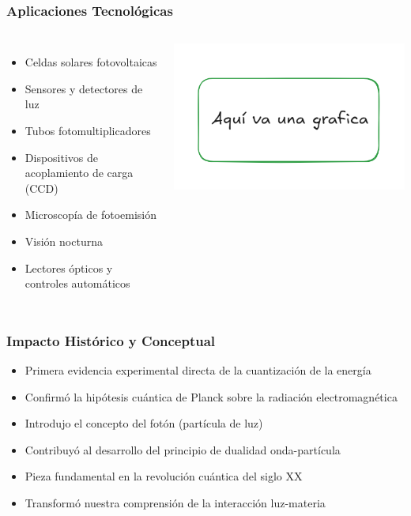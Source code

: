 \documentclass{beamer}
\begin{document}
	\begin{frame}
		\frametitle{Aplicaciones Tecnológicas}
		\begin{columns}
			\begin{itemize}
				\item Celdas solares fotovoltaicas
				\item Sensores y detectores de luz
				\item Tubos fotomultiplicadores
				\item Dispositivos de acoplamiento de carga (CCD)
				\item Microscopía de fotoemisión
				\item Visión nocturna
				\item Lectores ópticos y controles automáticos
			\end{itemize}
			
			\includegraphics[width=\textwidth]{../Imagenes/grafica_pendiente}
		\end{columns}
	\end{frame}
	
	\begin{frame}
		\frametitle{Impacto Histórico y Conceptual}
		\begin{itemize}
			\item Primera evidencia experimental directa de la cuantización de la energía
			\item Confirmó la hipótesis cuántica de Planck sobre la radiación electromagnética
			\item Introdujo el concepto del fotón (partícula de luz)
			\item Contribuyó al desarrollo del principio de dualidad onda-partícula
			\item Pieza fundamental en la revolución cuántica del siglo XX
			\item Transformó nuestra comprensión de la interacción luz-materia
		\end{itemize}
	\end{frame}
	
\end{document}
